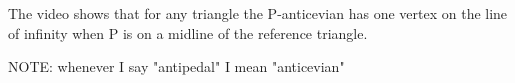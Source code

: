 The video shows that for any triangle the P-anticevian has one vertex on the line of infinity when P is on a midline of the reference triangle.

NOTE: whenever I say "antipedal" I mean "anticevian"
